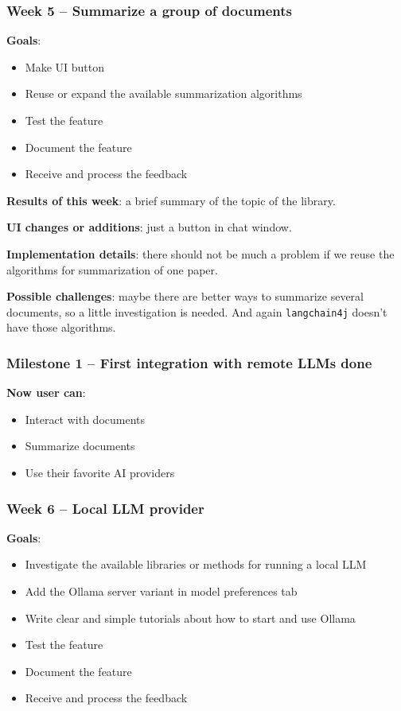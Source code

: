 \documentclass{article}
\begin{document}
	\subsubsection{Week 5 -- Summarize a group of documents}
	\textbf{Goals}:
	\begin{itemize}
		\item Make UI button
		\item Reuse or expand the available summarization algorithms
		\item Test the feature
		\item Document the feature
		\item Receive and process the feedback
	\end{itemize}
	
	\textbf{Results of this week}: a brief summary of the topic of the library.
	
	\textbf{UI changes or additions}: just a button in chat window.
	
	\textbf{Implementation details}: there should not be much a problem if we reuse the algorithms for summarization of one paper.
	
	\textbf{Possible challenges}: maybe there are better ways to summarize several documents, so a little investigation is needed. And again \texttt{langchain4j} doesn't have those algorithms.
	
	\subsubsection{Milestone 1 -- First integration with remote LLMs done}
	\textbf{Now user can}:
	\begin{itemize}
		\item Interact with documents
		\item Summarize documents
		\item Use their favorite AI providers
	\end{itemize}
	
	\subsubsection{Week 6 -- Local LLM provider}
	\textbf{Goals}:
	\begin{itemize}
		\item Investigate the available libraries or methods for running a local LLM
		\item Add the Ollama server variant in model preferences tab
		\item Write clear and simple tutorials about how to start and use Ollama
		\item Test the feature
		\item Document the feature
		\item Receive and process the feedback
	\end{itemize}
	
\end{document}
